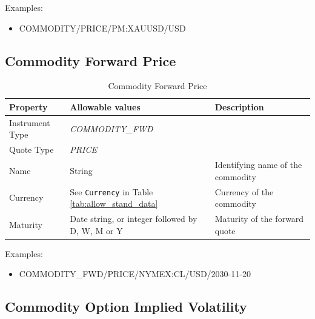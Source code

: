 \medskip
Examples:
\begin{itemize}
    \item {COMMODITY/PRICE/PM:XAUUSD/USD}
\end{itemize}
\subsection{Commodity Forward Price}

\begin{table}[H]
    \centering
    \begin{tabular}{|p{3cm}|p{4.5cm}|p{7cm}|}
        \hline
        {\bf Property} & {\bf Allowable values} & {\bf Description} \\ \hline
        Instrument Type & \emph{COMMODITY\_FWD} & \\ \hline
        Quote Type & \emph{PRICE} & \\ \hline
        Name & String & Identifying name of the commodity \\ \hline
        Currency & See \lstinline!Currency! in Table \ref{tab:allow_stand_data}&  Currency of the commodity \\ \hline
        Maturity & Date string, or integer followed by D, W, M or Y & Maturity of the forward quote \\ \hline
    \end{tabular}
    \caption{Commodity Forward Price}
    \label{tab:comfwd_quote}
\end{table}

\medskip
Examples:
\begin{itemize}
    \item {COMMODITY\_FWD/PRICE/NYMEX:CL/USD/2030-11-20}
\end{itemize}



\subsection{Commodity Option Implied Volatility}
\label{md:commodity_option_iv}

